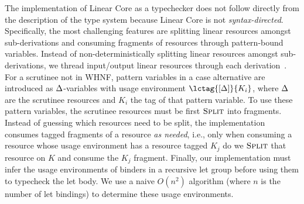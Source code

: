 \documentclass[acmsmall,review,screen]{acmart}
\begin{document}

The implementation of Linear Core as a typechecker does not follow
directly from the description of the type system because Linear Core
is not \emph{syntax-directed}. Specifically, the most challenging
features are splitting linear resources amongst sub-derivations and
consuming fragments of resources through pattern-bound variables.
Instead of non-deterministically splitting linear resources amongst
sub-derivations, we thread input/output linear resources through each
derivation~\cite{DBLP:journals/tcs/CervesatoHP00}.
%
For a scrutinee not in WHNF, pattern variables in a case alternative are
introduced as $\Delta$-variables with usage environment $\lctag{\irr{\D}}{K_i}$,
where $\Delta$ are the scrutinee resources and $K_i$ the tag of that pattern
variable. To use these pattern variables, the scrutinee resources must be first
$\textsc{Split}$ into fragments. Instead of guessing which resources need to be split,
the implementation consumes tagged fragments of a resource \emph{as needed},
i.e., only when consuming a resource whose usage environment has a resource
tagged $K_j$ do we $\textsc{Split}$ that resource on $K$ and consume the $K_j$ fragment.
%
Finally, our implementation must infer the usage environments of binders in
a recursive let group before using them to typecheck the let body. We use a
naive $O(n^2)$ algorithm (where $n$ is the number of let bindings) to determine
these usage environments. %
%
%
%
%


\end{document}
